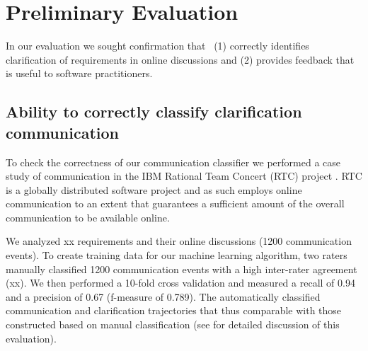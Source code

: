\section{Preliminary Evaluation}
In our evaluation we sought confirmation that \viss\ (1) correctly identifies clarification of requirements in online discussions and (2) provides feedback that is useful to software practitioners. 

\subsection{Ability to correctly classify clarification communication}
To check the correctness of our communication classifier we performed a case study of communication in the IBM Rational Team Concert (RTC) project \cite{Knauss2012f}. RTC is a globally distributed software project and as such employs online communication to an extent that guarantees a sufficient amount of the overall communication to be available online.



We analyzed xx requirements and their online discussions (1200 communication events). To create training data for our machine learning algorithm, two raters manually classified 1200 communication events with a high inter-rater agreement (xx).  
We then performed a 10-fold cross validation and measured a recall of 0.94 and a precision of  0.67 (f-measure of 0.789). The automatically classified communication and clarification trajectories that thus comparable with those constructed based on manual classification (see \cite{Knauss2012f} for detailed discussion of this evaluation).

